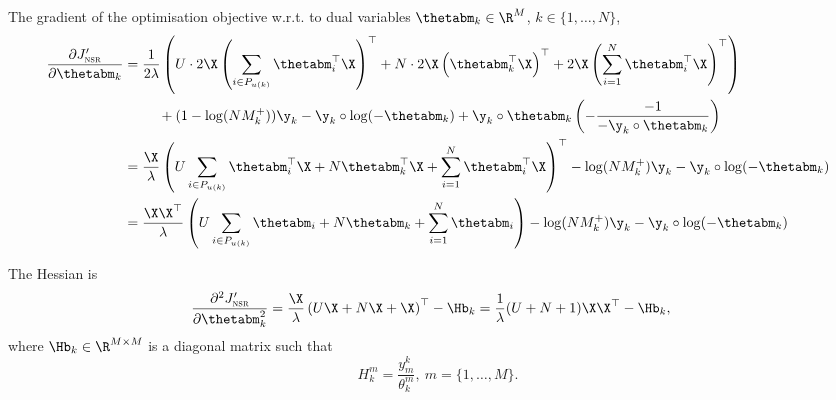 The gradient of the optimisation objective w.r.t. to dual variables $\thetabm_k \in \R^{M}$, $k \in \{1,\dots,N\}$,
\begin{equation*}
\begin{aligned}
\frac{\partial J_\textsc{nsr}'}{\partial \thetabm_k}
&= \frac{1}{2 \lambda} \left( U \cdot 2 \X \left(\sum_{i \in P_{u(k)}} \thetabm_i^\top \X \right)^\top 
   + N \cdot 2 \X \left( \thetabm_k^\top \X \right)^\top
   + 2 \X \left(\sum_{i=1}^N \thetabm_i^\top \X \right)^\top \right) \\
& \hspace{2.5em}
   + (1 - \log(N M_k^+)) \y_k - \y_k \circ \log(-\thetabm_k) + \y_k \circ \thetabm_k \left( -\frac{-1}{-\y_k \circ \thetabm_k} \right) \\
&= \frac{\X}{\lambda} \left( U \sum_{i \in P_{u(k)}} \thetabm_i^\top \X 
   + N \thetabm_k^\top \X 
   + \sum_{i=1}^N \thetabm_i^\top \X \right)^\top
   - \log(N M_k^+) \y_k - \y_k \circ \log(-\thetabm_k) \\
&= \frac{\X \X^\top}{\lambda} \left( U \sum_{i \in P_{u(k)}} \thetabm_i + N \thetabm_k + \sum_{i=1}^N \thetabm_i \right)
   - \log(N M_k^+) \y_k - \y_k \circ \log(-\thetabm_k) \\
\end{aligned}
\end{equation*}

The Hessian is
\begin{equation*}
\begin{aligned}
\frac{\partial^2 J_\textsc{nsr}'}{\partial \thetabm_k^2}
&= \frac{\X}{\lambda} \left( U \X + N \X + \X \right)^\top - \Hb_k
 = \frac{1}{\lambda} (U + N + 1) \X \X^\top - \Hb_k,
\end{aligned}
\end{equation*}
where $\Hb_k \in \R^{M \times M}$ is a diagonal matrix such that
\begin{equation*}
H_k^m = \frac{y_m^k}{\theta_k^m}, \ m = \{1,\dots,M\}.
\end{equation*}
